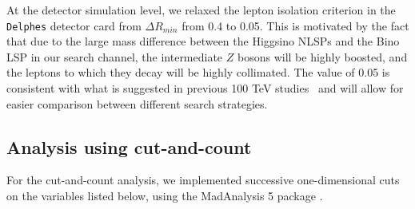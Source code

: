 \documentclass[a4paper,11pt]{article}
\begin{document}
At the detector simulation level, we relaxed the lepton isolation criterion in the
\texttt{Delphes} detector card from $\Delta R_{min}$ from 0.4 to 0.05. This is
motivated by the fact that due to the large mass difference between the Higgsino
NLSPs and the Bino LSP in our search channel, the intermediate $Z$ bosons will be
highly boosted, and the leptons to which they decay will be highly collimated.
The value of 0.05 is consistent with what is suggested in previous 100 TeV
studies~\cite{Acharya:2014pua,Gori:2014oua,Bramante:2014tba} and will allow
for easier comparison between different search strategies.   


\subsection{Analysis using cut-and-count}
\label{event-selection}

For the cut-and-count analysis, we implemented successive one-dimensional cuts
on the variables listed below, using the MadAnalysis 5 package
\cite{Conte:2012fm}.
\end{document}
